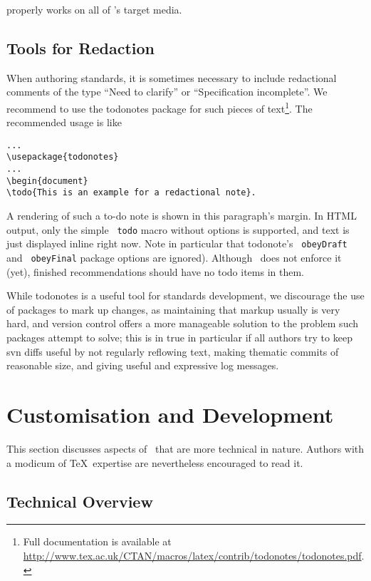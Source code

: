 \documentclass[11pt,a4paper]{ivoa}
\newcommand{\texword}[1]{\texttt{\color{texcolor} #1}}
\begin{document}
properly works on all of \ivoatex's target media.

\subsection{Tools for Redaction}

When authoring standards, it is sometimes necessary to include
redactional comments of the type ``Need to clarify'' or ``Specification
incomplete''.  We recommend to use the todonotes package for such
pieces of text\footnote{Full documentation is available at
\url{http://www.tex.ac.uk/CTAN/macros/latex/contrib/todonotes/todonotes.pdf}.}.
The recommended usage is like

\begin{lstlisting}
...
\usepackage{todonotes}
...
\begin{document}
\todo{This is an example for a redactional note}.
\end{lstlisting}

A rendering of such a to-do note is shown in this paragraph's
margin. In HTML output,
only the simple \texword{todo} macro without options is supported, and
text is just displayed inline right now.  Note in particular that
todonote's \texword{obeyDraft} and \texword{obeyFinal} package options
are ignored).  Although \ivoatex\ does not enforce it (yet), finished
recommendations should have no todo items in them.

While todonotes is a useful tool for standards development, we
discourage the use of packages to mark up changes, as maintaining that
markup usually is very hard, and version control offers a more
manageable solution to the problem such packages attempt to solve; this
is in true in particular if all authors try to keep svn diffs useful by
not regularly reflowing text, making thematic commits of reasonable
size, and giving useful and expressive log messages.


\section{Customisation and Development}
\label{sect:impl}

This section discusses aspects of \ivoatex\ that are more technical in
nature.  Authors with a modicum of \TeX\ expertise are nevertheless
encouraged to read it.

\subsection{Technical Overview}
\end{document}
